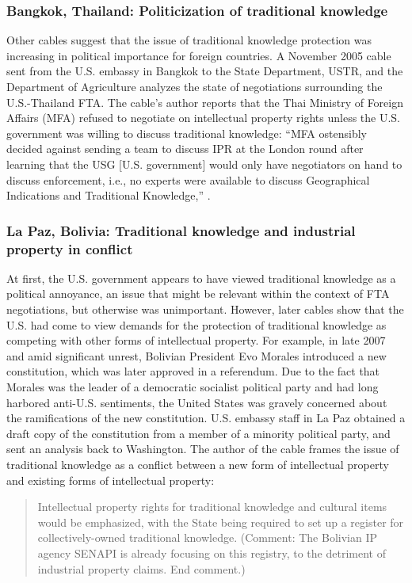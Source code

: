\documentclass[12pt]{article}
\begin{document}
\subsubsection*{Bangkok, Thailand: Politicization of traditional knowledge}
Other cables suggest that the issue of traditional knowledge protection was increasing in political 
importance for foreign countries. A November 2005 cable sent from the U.S. embassy in Bangkok to the 
State Department, 
USTR, and the Department of Agriculture analyzes the state of negotiations surrounding the 
U.S.-Thailand FTA.
The cable's author reports that the Thai Ministry of Foreign Affairs (MFA) refused to negotiate on  
intellectual property rights unless the U.S. government was willing to discuss traditional knowledge: 
``MFA ostensibly decided against sending a team to discuss IPR at the London round after learning that 
the USG [U.S. government] would only have negotiators on hand to discuss enforcement, i.e., no experts were available to 
discuss Geographical Indications and Traditional 
Knowledge,'' \citep{u.s._department_of_state2005u.s.-thailand}.

\subsubsection*{La Paz, Bolivia: Traditional knowledge and industrial property in conflict}
At first, the U.S. government appears to have viewed traditional knowledge as a political annoyance, 
an issue that might be relevant within the context of FTA negotiations, but otherwise was 
unimportant. However, later cables show that the U.S. had come to view demands for the protection 
of traditional knowledge as competing with other forms of intellectual property. For example, 
in late 2007 and amid significant unrest, Bolivian President Evo Morales introduced a new 
constitution, which was later approved in a referendum. Due to the fact that Morales was the 
leader of a democratic socialist political party and had 
long harbored anti-U.S. sentiments, the United States was gravely concerned about the ramifications 
of the new constitution. U.S. embassy staff in La Paz obtained a draft copy of the constitution from a 
member of a minority political party, and sent an analysis back to Washington. The author of the cable 
frames the issue of traditional knowledge as a conflict between a new form of intellectual property 
and existing forms of intellectual property:
\begin{quote}Intellectual property
rights for traditional knowledge and cultural items would be emphasized, with the State being required 
to set up a register for collectively-owned traditional knowledge. (Comment: The Bolivian IP agency 
SENAPI is already focusing on this registry, to the detriment of industrial property claims. 
End comment.) \citep{u.s._department_of_state2007bolivia:}
\end{quote}
\end{document}
